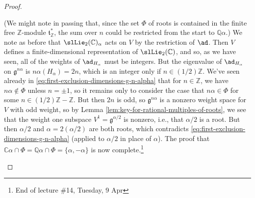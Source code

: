 \documentclass[reqno]{amsart} 
\begin{document}
\begin{proof}
\begin{enumerate}
    (We might note in passing that, since the set $\Phi$ of roots is contained in the finite free $\mathbb{Z}$-module $\mathfrak{t}_{\mathbb{Z}}^*$, the sum over $n$ could be restricted from the start to $\mathbb{Q} \alpha$.)  We note as before that $\slLie_2(\mathbb{C})_\alpha$ acts on $V$ by the restriction of $\ad$.  Then $V$ defines a finite-dimensional representation of $\slLie_2(\mathbb{C})$, and so, as we have seen, all of the weights of $\ad_{H_\alpha}$ must be integers.  But the eigenvalue of $\ad_{H_\alpha}$ on $\mathfrak{g}^{n \alpha}$ is $n \alpha(H_\alpha) = 2 n$, which is an integer only if $n \in (1/2) \mathbb{Z}$.  We've seen already in \eqref{eq:first-exclusion-dimensions-g-n-alpha} that for $n \in \mathbb{Z}$, we have $n \alpha \notin \Phi$ unless $n = \pm 1$, so it remains only to consider the case that $n \alpha \in \Phi$ for some $n \in (1/2) \mathbb{Z} - \mathbb{Z}$.  But then $2 n$ is odd, so $\mathfrak{g}^{n \alpha}$ is a nonzero weight space for $V$ with odd weight, so by Lemma \ref{lem:key-for-rational-multiples-of-roots}, we see that the weight one subspace $V^1 = \mathfrak{g}^{\alpha/2}$ is nonzero, i.e., that $\alpha/2$ is a root.  But then $\alpha/2$ and $\alpha = 2 (\alpha/2)$ are both roots, which contradicts \eqref{eq:first-exclusion-dimensions-g-n-alpha} (applied to $\alpha/2$ in place of $\alpha$).  The proof that $\mathbb{C} \alpha \cap \Phi = \mathbb{Q} \alpha \cap \Phi = \{\alpha, -\alpha \}$ is now complete.\footnote{End of lecture \#14, Tuesday, 9 Apr}
    

\end{enumerate}
\end{proof}
\end{document}
